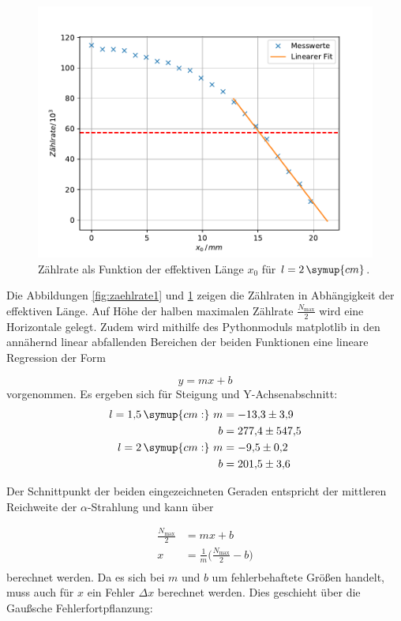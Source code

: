 \begin{figure}[h!tbp]
	\centering
	\includegraphics[width=0.8\linewidth]{zaehlrate_weglaenge2.pdf}
	\caption{Zählrate als Funktion der effektiven Länge $x_0$ für $l=2\,\symup{cm}$.}
	\label{fig:zaehlrate2}
\end{figure}



Die Abbildungen \ref{fig:zaehlrate1} und \ref{fig:zaehlrate2} zeigen die Zählraten in Abhängigkeit der effektiven Länge. Auf Höhe der halben maximalen Zählrate $\frac{N_{\text{max}}}{2}$ wird eine Horizontale gelegt. 
Zudem wird mithilfe des Pythonmoduls matplotlib in den annähernd linear abfallenden Bereichen der beiden Funktionen eine lineare Regression der Form

\begin{equation*}
y = mx + b
\end{equation*}
vorgenommen. Es ergeben sich für Steigung und Y-Achsenabschnitt:
\begin{equation*}
\begin{aligned}
l = 1{,}5\,\symup{cm:}\,\, m &= -13{,}3 \pm 3{,}9 \\
                         b &= 277{,}4 \pm 547{,}5 \\
l = 2\,\symup{cm:}\,\,   m &= -9{,}5  \pm 0{,}2\\
                         b &= 201{,}5 \pm 3{,}6 \\ 
\end{aligned}
\end{equation*}


Der Schnittpunkt der beiden eingezeichneten Geraden entspricht der mittleren Reichweite der $\alpha$-Strahlung und kann über

\begin{equation*}
\begin{aligned}
\frac{N_{\text{max}}}{2} &= mx + b \\
x &= \frac{1}{m} \biggl(\frac{N_{\text{max}}}{2} - b \biggr) \\
\end{aligned}
\end{equation*}
berechnet werden. Da es sich bei $m$ und $b$ um fehlerbehaftete Größen handelt, muss auch für $x$ ein Fehler $\Delta x$ berechnet werden. Dies geschieht über die Gaußsche Fehlerfortpflanzung: 

